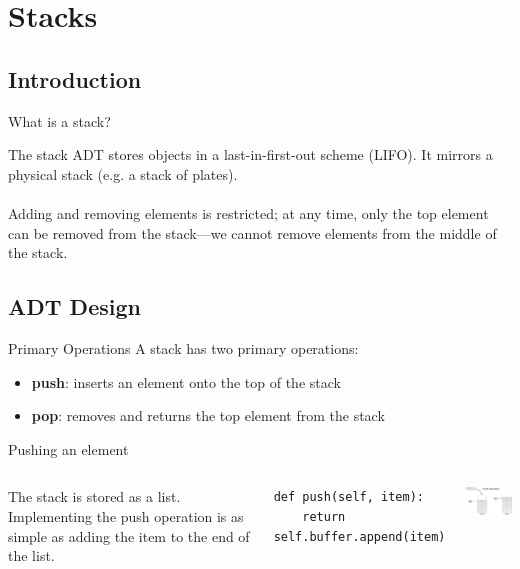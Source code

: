 \documentclass{beamer}
\begin{document}
\section{Stacks}
\subsection{Introduction}
\begin{frame}{What is a stack?}

The stack ADT stores objects in a last-in-first-out scheme (LIFO). It mirrors a physical stack (e.g. a stack of plates).\\~\\
Adding and removing elements is restricted; at any time, only the top element can be removed from the stack---we cannot remove elements from the middle of the stack.
\end{frame}

\subsection{ADT Design}
\begin{frame}{Primary Operations}
A stack has two primary operations:
\begin{itemize}
    \item \textbf{push}: inserts an element onto the top of the stack
    \item \textbf{pop}: removes and returns the top element from the stack
\end{itemize}
\end{frame}

\begin{frame}[fragile]{Pushing an element}
\begin{columns}
    The stack is stored as a list. Implementing the push operation is as simple as adding the item to the end of the list.
    \begin{center}
    \begin{lstlisting}[language=iPython]
def push(self, item):
    return self.buffer.append(item)\end{lstlisting}
    \end{center}
    \centering
    \includegraphics[width=3.5cm]{lessons/images/stack_push_operation.jpg}
\end{columns}
\end{frame}
\end{document}
